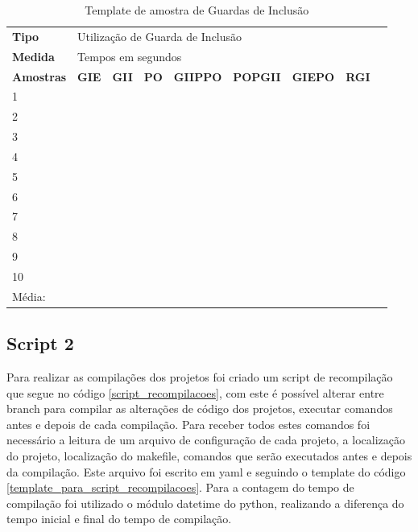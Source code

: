 \begin{table}[!ht]
\centering
\caption{Template de amostra de Guardas de Inclusão}
\label{tab:modelo_guards}
\begin{tiny}
\begin{tabular}{lp{1cm}p{1cm}p{1cm}p{1cm}p{1cm}p{1cm}p{1cm}p{1cm}}
\toprule
\textbf{Tipo} & \multicolumn{7}{l}{Utilização de Guarda de Inclusão} \\
\textbf{Medida} & \multicolumn{7}{l}{Tempos em segundos } \\
\textbf{Amostras} & \textbf{GIE} & \textbf{GII} & \textbf{PO} & 
\textbf{GIIPPO} & \textbf{POPGII} & \textbf{GIEPO} & \textbf{RGI} \\ \midrule
 1  &  &  &   &   &   &   &  \\ \midrule
 2  &  &  &   &   &   &   &  \\ \midrule
 3  &  &  &   &   &   &   &  \\ \midrule
 4  &  &  &   &   &   &   &  \\ \midrule
 5  &  &  &   &   &   &   &  \\ \midrule
 6  &  &  &   &   &   &   &  \\ \midrule
 7  &  &  &   &   &   &   &  \\ \midrule 
 8  &  &  &   &   &   &   &  \\ \midrule
 9  &  &  &   &   &   &   &  \\ \midrule
 10 &  &  &   &   &   &   &  \\ \midrule
 Média: & & & & &   &   &    \\ \bottomrule
\end{tabular}
\end{tiny}
\end{table}


\subsection{Script 2}

Para realizar as compilações dos projetos foi criado um script de recompilação que segue no código \ref{script_recompilacoes},
 com este é possível alterar entre  branch para compilar as alterações de código dos projetos,
 executar comandos antes e depois de cada compilação. Para receber todos estes comandos foi
 necessário a leitura de um arquivo de configuração de cada projeto,
 a localização do projeto, localização do makefile, comandos que serão executados antes e depois
 da compilação. Este arquivo foi escrito em yaml e seguindo o template do código \ref{template_para_script_recompilacoes}.
Para a contagem do tempo de compilação foi utilizado o módulo datetime do python,
 realizando a diferença do tempo inicial e final do tempo de compilação.



